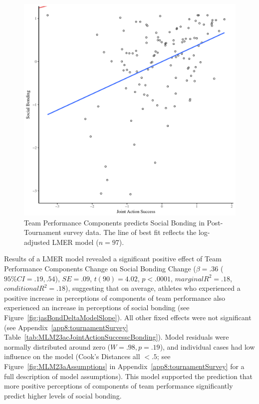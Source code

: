 \begin{CJK}{UTF8}{gbsn}
  \begin{figure}[htbp]
    \centering
  \includegraphics[scale=.5]{images/jasBondModelSlope.pdf}
    \caption{Team Performance Components predicts Social Bonding in Post-Tournament survey data. The line of best fit reflects the log-adjusted LMER model ($n = 97$).}
    \label{fig:jasBondModelSlope}
  \end{figure}


Results of a LMER model revealed a significant positive effect of  Team Performance Components Change on Social Bonding Change ($\beta = .36$ ($95\% CI =  .19, .54$), $SE = .09$, $t(90) = 4.02$, $p < .0001$, $marginal R^2 = .18$, $conditional R^2 = .18$), suggesting that on average, athletes who experienced a positive increase in perceptions of components of team performance also experienced an increase in perceptions of social bonding (see Figure~\ref{fig:jasBondDeltaModelSlope}). All other fixed effects were not significant (see Appendix~\ref{app8:tournamentSurvey} Table~\ref{tab:MLM23acJointActionSuccesscBonding}). Model residuals were normally distributed around zero ($W = .98, p = .19$), and individual cases had low influence on the model (Cook's Distances all $< .5$; see Figure~\ref{fig:MLM23aAssumptions} in Appendix~\ref{app8:tournamentSurvey} for a full description of model assumptions).  This model supported the prediction that more positive perceptions of components of team performance significantly predict higher levels of social bonding.



\end{CJK}

